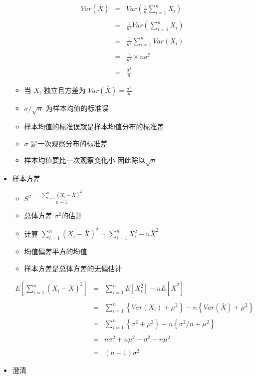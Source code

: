 \documentclass[
]{book}
\providecommand{\tightlist}{%
  \setlength{\itemsep}{0pt}\setlength{\parskip}{0pt}}
\begin{document}
\begin{itemize}
  \begin{eqnarray*}
    Var(\bar X) & = & Var \left( \frac{1}{n}\sum_{i=1}^n X_i \right)\\ \\
    & = & \frac{1}{n^2} Var\left(\sum_{i=1}^n X_i \right)\\ \\
    & = & \frac{1}{n^2} \sum_{i=1}^n Var(X_i) \\ \\
    & = & \frac{1}{n^2} \times n\sigma^2 \\ \\
    & = & \frac{\sigma^2}{n}
  \end{eqnarray*}

  \begin{itemize}
  \tightlist
  \item
    当 \(X_i\) 独立且方差为 \(Var(\bar X) = \frac{\sigma^2}{n}\)
  \item
    \(\sigma/\sqrt{n}\) 为样本均值的标准误
  \item
    样本均值的标准误就是样本均值分布的标准差
  \item
    \(\sigma\) 是一次观察分布的标准差
  \item
    样本均值要比一次观察变化小 因此除以\(\sqrt{n}\)
  \end{itemize}
\item
  样本方差

  \begin{itemize}
  \tightlist
  \item
    \(S^2 = \frac{\sum_{i=1}^n (X_i - \bar X)^2}{n-1}\)
  \item
    总体方差 \(\sigma^2\)的估计
  \item
    计算 \(\sum_{i=1}^n (X_i - \bar X)^2 = \sum_{i=1}^n X_i^2 - n \bar X^2\)
  \item
    均值偏差平方的均值
  \item
    样本方差是总体方差的无偏估计
  \end{itemize}

  \begin{eqnarray*}
    E\left[\sum_{i=1}^n (X_i - \bar X)^2\right] & = & \sum_{i=1}^n E\left[X_i^2\right] - n E\left[\bar X^2\right] \\ \\
    & = & \sum_{i=1}^n \left\{Var(X_i) + \mu^2\right\} - n \left\{Var(\bar X) + \mu^2\right\} \\ \\
    & = & \sum_{i=1}^n \left\{\sigma^2 + \mu^2\right\} - n \left\{\sigma^2 / n + \mu^2\right\} \\ \\
    & = & n \sigma^2 + n \mu ^ 2 - \sigma^2 - n \mu^2 \\ \\
    & = & (n - 1) \sigma^2
  \end{eqnarray*}
\item
  澄清


\end{itemize}
\end{document}
